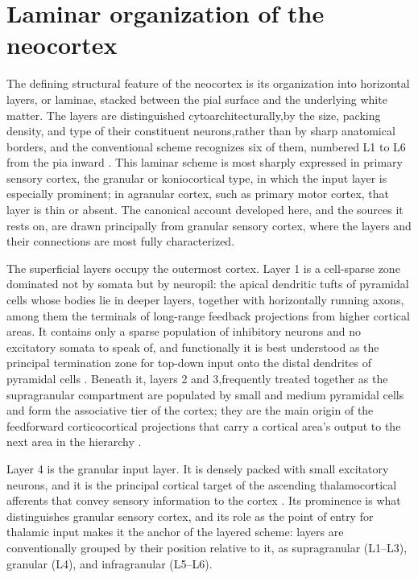 \section{Laminar organization of the neocortex}
\label{sec:bio-laminar}

The defining structural feature of the neocortex is its organization into horizontal layers, or laminae, stacked between the pial surface and the underlying white matter. The layers are distinguished cytoarchitecturally,by the size, packing density, and type of their constituent neurons,rather than by sharp anatomical borders, and the conventional scheme recognizes six of them, numbered L1 to L6 from the pia inward \parencite{white1989, shepherd2018}. This laminar scheme is most sharply expressed in primary sensory cortex, the granular or koniocortical type, in which the input layer is especially prominent; in agranular cortex, such as primary motor cortex, that layer is thin or absent. The canonical account developed here, and the sources it rests on, are drawn principally from granular sensory cortex, where the layers and their connections are most fully characterized.

The superficial layers occupy the outermost cortex. Layer 1 is a cell-sparse zone dominated not by somata but by neuropil: the apical dendritic tufts of pyramidal cells whose bodies lie in deeper layers, together with horizontally running axons, among them the terminals of long-range feedback projections from higher cortical areas. It contains only a sparse population of inhibitory neurons and no excitatory somata to speak of, and functionally it is best understood as the principal termination zone for top-down input onto the distal dendrites of pyramidal cells \parencite{shepherd2018}. Beneath it, layers 2 and 3,frequently treated together as the supragranular compartment are populated by small and medium pyramidal cells and form the associative tier of the cortex; they are the main origin of the feedforward corticocortical projections that carry a cortical area's output to the next area in the hierarchy \parencite{douglas2004}.

Layer 4 is the granular input layer. It is densely packed with small excitatory neurons, and it is the principal cortical target of the ascending thalamocortical afferents that convey sensory information to the cortex \parencite{white1989, douglas2004}. Its prominence is what distinguishes granular sensory cortex, and its role as the point of entry for thalamic input makes it the anchor of the layered scheme: layers are conventionally grouped by their position relative to it, as supragranular (L1--L3), granular (L4), and infragranular (L5--L6).

